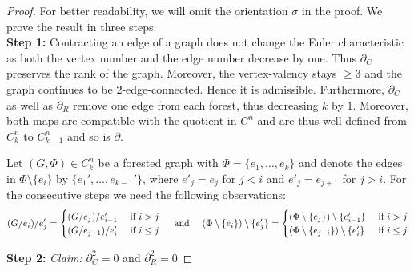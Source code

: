 \begin{proof}
	For better readability, we will omit the orientation $\sigma$ in the proof.
	We prove the result in three steps:\\
	\textbf{Step 1:} Contracting an edge of a graph does not change the Euler characteristic as both the vertex number and the edge number decrease by one.
	Thus $\partial_{C}$ preserves the rank of the graph. Moreover, the vertex-valency stays $\geq 3$ and the graph continues to be $2$-edge-connected.
	Hence it is admissible.
	Furthermore, $\partial_{C}$ as well as $\partial_{R}$ remove one edge from each forest, thus decreasing
	$k$ by $1$. Moreover, both maps are compatible with the quotient in $C^{n}$ and are thus well-defined from $C^{n}_{k}$ to $C^{n}_{k-1}$ and so is $\partial$.

	Let $(G,\Phi) \in C^{n}_{k}$ be a forested graph with $\Phi = \{e_1,\ldots,e_{k}\}$  and denote the edges in $\Phi \setminus \{e_{i}\}$ by $\{e_1',\ldots,e_{k-1}'\}$,
	where $e'_{j} = e_{j}$ for $j < i$ and $e'_{j} = e_{j+1}$ for $j > i$.
	For the consecutive steps we need the following observations:
	\[
		(G / e_{i}) /  e_{j}' = \begin{cases}
			(G / e_{j}) / e_{i-1}' & \text{ if } i > j\\
			(G / e_{j+1}) / e_{i}' & \text{ if } i \leq j
		\end{cases}
		\qq{ and }
		(\Phi \setminus \{e_{i}\}) \setminus \{e_{j}'\}  = \begin{cases}	
			(\Phi \setminus \{e_{j}\}) \setminus \{e_{i-1}'\} & \text{ if } i > j\\
			(\Phi \setminus \{e_{j+i}\}) \setminus \{e_{i}'\} & \text{ if } i \leq j
		\end{cases}
	\]

	\textbf{Step 2:} \emph{Claim:} $\partial_{C}^2 = 0$ and $\partial_{R}^2 = 0$


\end{proof}
